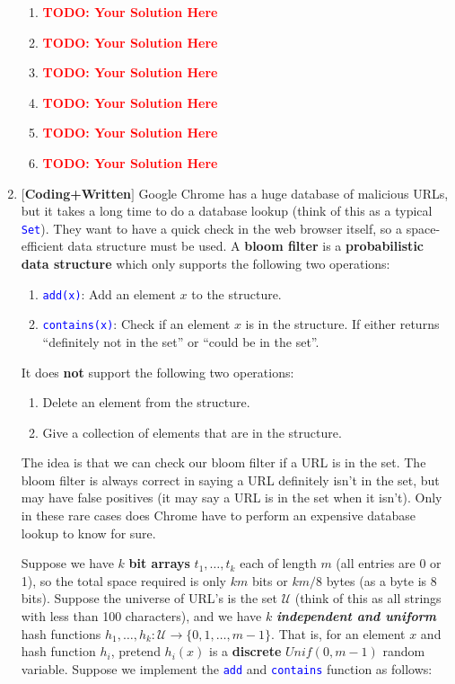 \documentclass[12pt]{article}
\def\code#1{\textcolor{blue}{\texttt{#1}}}
\def\todo#1{\textcolor{red}{\textbf{#1}}}
\renewcommand{\|}{\mid}
\begin{document}
\begin{enumerate}
\begin{tcolorbox}
\begin{enumerate}
\item \todo{TODO: Your Solution Here}
\item \todo{TODO: Your Solution Here}
\item \todo{TODO: Your Solution Here}
\item \todo{TODO: Your Solution Here}
\item \todo{TODO: Your Solution Here}
\item \todo{TODO: Your Solution Here}
\end{enumerate}
\end{tcolorbox}


\pagebreak
\item $[$\textbf{Coding+Written}$]$ Google Chrome has a huge database of malicious URLs, but it takes a long time to do a database lookup (think of this as a typical \code{Set}). They want to have a quick check in the web browser itself, so a space-efficient data structure must be used. A \textbf{bloom filter} is a \textbf{probabilistic data structure} which only supports the following two operations:
\begin{enumerate}[label=\Roman*.]
    \item \code{add(x)}: Add an element $x$ to the structure.
    \item \code{contains(x)}: Check if an element $x$ is in the structure. If either returns ``definitely not in the set'' or ``could be in the set''.
\end{enumerate}
It does \textbf{not} support the following two operations:
\begin{enumerate}[label=\Roman*.]
    \item Delete an element from the structure.
    \item Give a collection of elements that are in the structure.
\end{enumerate}

The idea is that we can check our bloom filter if a URL is in the set. The bloom filter is always correct in saying a URL definitely isn't in the set, but may have false positives (it may say a URL is in the set when it isn't). Only in these rare cases does Chrome have to perform an expensive database lookup to know for sure.

Suppose we have  $k$ \textbf{bit arrays} $t_1,\dots,t_k$ each of length $m$ (all entries are 0 or 1), so the total space required is only $km$ bits or $km/8$ bytes (as a byte is 8 bits). Suppose the universe of URL's is the set $\mathcal{U}$ (think of this as all strings with less than 100 characters), and we have $k$ \textit{\textbf{independent and uniform}} hash functions $h_1,\dots,h_k:\mathcal{U}\to\{0,1,\dots,m-1\}$. That is, for an element $x$ and hash function $h_i$, pretend $h_i(x)$ is a \textbf{discrete} $Unif(0,m-1)$ random variable. Suppose we implement the \code{add} and \code{contains} function as follows:


\end{enumerate}
\end{document}
